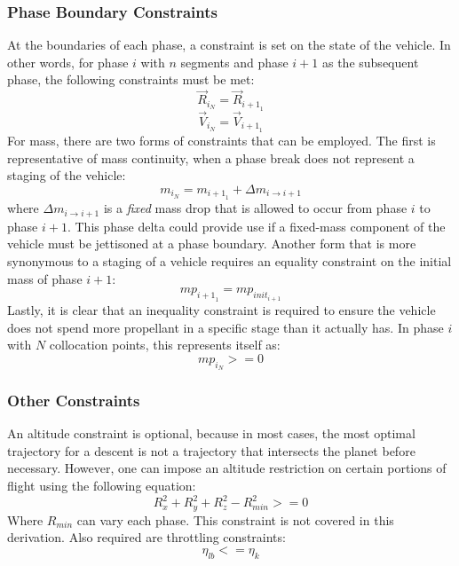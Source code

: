 \subsubsection{Phase Boundary Constraints}
At the boundaries of each phase, a constraint is set on the state of the vehicle. In other words, for phase $i$ with $n$ segments and phase $i+1$ as the subsequent phase, the following constraints must be met:
\begin{equation}
\vec{R}_{{i}_N} = \vec{R}_{{i+1}_1}
\end{equation}
\begin{equation}
\vec{V}_{{i}_N} = \vec{V}_{{i+1}_1}
\end{equation}
For mass, there are two forms of constraints that can be employed. The first is representative of mass continuity, when a phase break does not represent a staging of the vehicle:
\begin{equation}
m_{{i}_N} = m_{{i+1}_1} + \Delta m_{i \rightarrow i+1}
\end{equation}
where $\Delta m_{i \rightarrow i+1}$ is a \textit{fixed} mass drop that is allowed to occur from phase $i$ to phase $i+1$. This phase delta could provide use if a fixed-mass component of the vehicle must be jettisoned at a phase boundary. Another form that is more synonymous to a staging of a vehicle requires an equality constraint on the initial mass of phase $i+1$:
\begin{equation}
mp_{{i+1}_1} = mp_{\mathit{init}_{i+1}}
\end{equation}
Lastly, it is clear that an inequality constraint is required to ensure the vehicle does not spend more propellant in a specific stage than it actually has. In phase $i$ with $N$ collocation points, this represents itself as:
\begin{equation}
mp_{i_{N}} >= 0
\end{equation}
\subsubsection{Other Constraints}
An altitude constraint is optional, because in most cases, the most optimal trajectory for a descent is not a trajectory that intersects the planet before necessary. However, one can impose an altitude restriction on certain portions of flight using the following equation:
\begin{equation}
R_x^2 + R_y^2 + R_z^2 - R_{min}^2 >= 0
\end{equation}
Where $R_{min}$ can vary each phase. This constraint is not covered in this derivation. Also required are throttling constraints:
\begin{equation}
\eta_{lb} <= \eta_{k}
\end{equation}
\newpage
